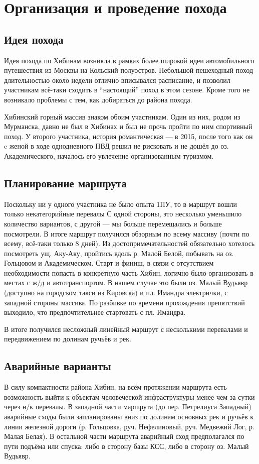 \section{Организация и проведение похода}
\subsection{Идея похода}
Идея похода по Хибинам возникла в рамках более широкой идеи автомобильного путешествия из Москвы на Кольский полуостров.
Небольшой пешеходный поход длительностью около недели отлично вписывался расписание, и позволил участникам
всё-таки сходить в \enquote{настоящий} поход в этом сезоне. Кроме того не возникало проблемы с тем,
как добираться до района похода.

Хибинский горный массив знаком обоим участникам. Один из них, родом из Мурманска, давно не был в Хибинах и был не прочь
пройти по ним спортивный поход. У второго участника, история романтическая --- в 2015, после того как он c женой
в ходе однодневного ПВД решил не рисковать и не дошёл до оз. Академического, началось его увлечение организованным туризмом.

\subsection{Планирование маршрута}
Поскольку ни у одного участника не было опыта 1ПУ, то в маршрут вошли только некатегорийные перевалы
С одной стороны, это несколько уменьшило количество вариантов, с другой --- мы больше перемещались и больше посмотрели.
В итоге маршрут получился обзорным по всему массиву (почти по всему, всё-таки только 8 дней).
Из достопримечательностей обязательно хотелось посмотреть ущ. Аку-Аку, пройтись вдоль р. Малой Белой,
побывать на оз. Гольцовом и Академическом. Старт и финиш, в связи с отсутствием необходимости попасть в
конкретную часть Хибин, логично было организовать в местах с ж/д и автотранспортом.
В нашем случае это были оз. Малый Вудьявр (доступно на городском такси из Кировска) и пл. Имандра электрички,
с западной стороны массива. По разбивке по времени прохождения препятствий выходило, что предпочтительнее стартовать
с пл. Имандра.

В итоге получился несложный линейный маршрут с несколькими перевалами и передвижением по долинам ручьёв и рек.

\subsection{Аварийные варианты}
В силу компактности района Хибин, на всём протяжении маршрута есть возможность выйти к объектам
человеческой инфраструктуры менее чем за сутки через н/к перевалы. В западной части маршрута
(до пер. Петрелиуса Западный) аварийные сходы были запланированы вниз по долинам основных рек и ручьёв к линии
железной дороги (р. Гольцовка, руч. Нефелиновый, руч. Медвежий Лог, р. Малая Белая). В остальной части маршрута
аварийный сход предполагался по пути подъёма или спуска: либо в сторону базы КСС, либо в сторону оз. Малый Вудьявр.

